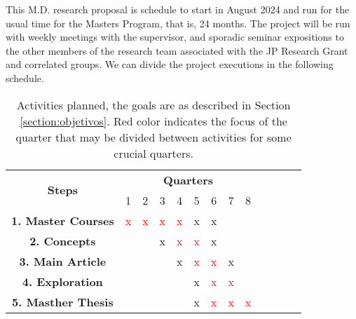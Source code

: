 
This M.D. research proposal is schedule to start in August 2024 and run for the usual time for the Masters Program, that is, 24 months. The project will be run with weekly meetings with the supervisor, and sporadic seminar expositions to the other members of the research team associated with the JP Research Grant and correlated groups. We can divide the project executions in the following schedule.

\begin{table}[ht]
\centering
\begin{tabular}{|c|c|c|c|c|c|c|c|c|c|c|c|c|}
\hline
\multirow{2}{*}{{\bf Steps}} & \multicolumn{8}{c|}{{\bf Quarters}}
\\ \cline{2-9}
    & 1 & 2 & 3 & 4 & 5 & 6 & 7 & 8
\\ \hline
    {\bf 1. Master Courses} & \textcolor{red}{x} & \textcolor{red}{x} & \textcolor{red}{x} & \textcolor{red}{x} & x & x & & 
\\ \hline
    {\bf 2. Concepts} &  &  & x & \textcolor{red}{x} & \textcolor{red}{x} & x & &
\\ \hline
    {\bf 3. Main Article} & & & & x & \textcolor{red}{x} & \textcolor{red}{x} & x &
\\ \hline
    {\bf 4. Exploration} & & & & & x & \textcolor{red}{x} & \textcolor{red}{x} & 
\\ \hline
    {\bf 5. Masther Thesis} & & & & & x & \textcolor{red}{x} & \textcolor{red}{x} & \textcolor{red}{x}
\\ \hline
\end{tabular}
\caption{Activities planned, the goals are as described in Section \ref{section:objetivos}. Red color indicates the focus of the quarter that may be divided between activities for some crucial quarters.}
\label{tab:cronograma1ano}
\end{table}

\pagebreak